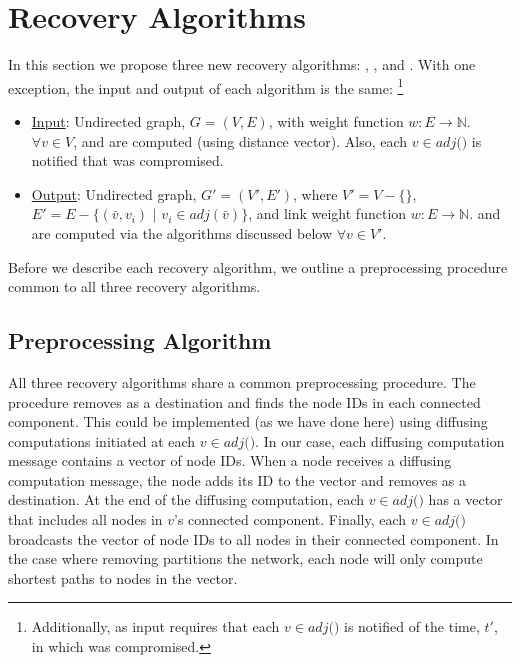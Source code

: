 \section{Recovery Algorithms}
\label{sec:algs}

In this section we propose three new recovery algorithms: \seconds, \purges, and \cprs.  
With one exception, the input and output of each algorithm is the same: 
{\footnote {\small Additionally, as input \cpr requires that each $v \in adj($\bads$)$ is notified of the time, $t'$, in which \bad was compromised.}}
\begin{itemize}
	\item \underline{Input}:  Undirected graph, $G=(V,E)$, with weight function $w: E \rightarrow \mathbb{N}$.  $\forall v \in V$,  \minv and \dmatrix are computed
(using distance vector). Also, each $v \in adj($\bads$)$ is notified that \bad was compromised.

	\item \underline{Output}: Undirected graph, $G'=(V',E')$, where $V' = V -\{$\bads$\}$, $E'=E - \{(\bar{v},v_i)$ $|$ $v_i \in adj(\bar{v}) \}$,
and link weight function $w:E \rightarrow \mathbb{N}$.  \minvv and \dmatrixv are computed via the algorithms discussed below $\forall  v \in V'$. 
\end{itemize}
Before we describe each recovery algorithm, we outline a preprocessing procedure common to all three recovery algorithms. %


\subsection{Preprocessing Algorithm}
\label{subsec:preprocess}
All three recovery algorithms share a common preprocessing procedure.  The procedure removes \bad as a destination and finds the node IDs in each connected component. 
This could be implemented (as we have done here) using diffusing computations \cite{Dijkstra80} initiated at each $v \in adj($\bads$)$. 
In our case, each diffusing computation message contains a vector of node IDs.  When 
a node receives a diffusing computation message, the node adds its ID to the vector and removes \bad as a destination. At the end of the diffusing computation, 
each $v \in adj($\bads$)$ has a vector that includes all nodes in $v$'s connected component. Finally, each $v \in adj($\bads$)$ broadcasts the vector of node IDs to 
all nodes in their connected component. In the case where removing \bad partitions the network, each node will only compute shortest paths to nodes in the vector. 



